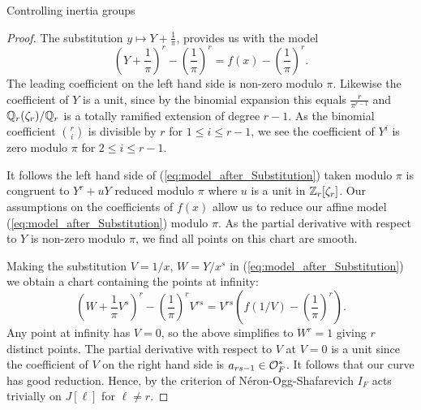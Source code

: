\documentclass[11pt,a4paper]{article}
\begin{document}
\begin{section}{Controlling inertia groups}
\begin{proof}
The substitution $y \mapsto Y+\frac{1}{\pi}$, provides us with the model
\begin{equation} \label{eq:model_after_Substitution}
\left(Y +\frac{1}{\pi}\right)^r - \left(\frac{1}{\pi}\right)^{r} = f(x) - \left(\frac{1}{\pi}\right)^{r}.
\end{equation}
The leading coefficient on the left hand side is non-zero modulo $\pi$.
Likewise the coefficient of $Y$ is a unit, since by the binomial expansion this equals $\frac{r}{\pi^{r-1}}$ and $\mathbb{Q}_r(\zeta_r)/ \mathbb{Q}_r$ is a totally ramified extension of degree $r-1$.
As the binomial coefficient ${r}\choose{i}$ is divisible by $r$ for $1 \leq i \leq r-1$, we see the coefficient of $Y^i$ is zero modulo $\pi$ for $2 \leq i \leq r-1$. 

It follows the left hand side of (\ref{eq:model_after_Substitution}) taken modulo $\pi$ is congruent to $Y^r + uY$ reduced modulo $\pi$ where $u$ is a unit in $\mathbb{Z}_r[\zeta_r]$.
Our assumptions on the coefficients of $f(x)$ allow us to reduce our affine model (\ref{eq:model_after_Substitution}) modulo $\pi$.
As the partial derivative with respect to $Y$ is non-zero modulo $\pi$, we find all points on this chart are smooth.

Making the substitution $V = 1/x$, $W = Y/x^s$ in (\ref{eq:model_after_Substitution}) we obtain a chart containing the points at infinity:
$$\left(W+\frac{1}{\pi}V^{s}\right)^r - \left(\frac{1}{\pi}\right)^rV^{rs} = V^{rs}\left(f(1/V)-\left(\frac{1}{\pi}\right)^r\right).$$
Any point at infinity has $V=0$, so the above simplifies to $W^r = 1$ giving $r$ distinct points.
The partial derivative with respect to $V$ at $V=0$ is a unit since the coefficient of $V$ on the right hand side is $a_{rs-1} \in \mathcal{O}^*_F$. It follows that our curve has good reduction.
Hence, by the criterion of N\'eron-Ogg-Shafarevich $I_F$ acts trivially on $J[\ell]$ for $\ell \neq r$.
\end{proof}
\end{section}
\end{document}

